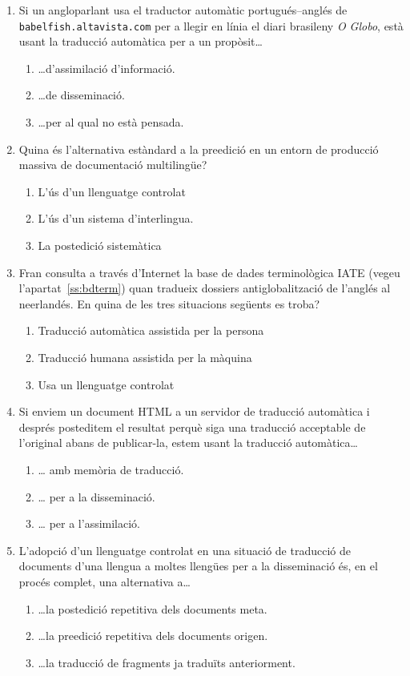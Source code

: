 \begin{enumerate}
\item Si un angloparlant usa el traductor automàtic portugués--anglés
  de \verb|babelfish.altavista.com| per a llegir en línia el diari
  brasileny \emph{O Globo}, està usant la traducció automàtica per a
  un propòsit\ldots
  \begin{enumerate}
  \item \ldots d'assimilació d'informació.
  \item \ldots de disseminació.
  \item \ldots per al qual no està pensada.
  \end{enumerate}

\item Quina és l'alternativa estàndard a la preedició en un entorn de
  producció massiva de documentació multilingüe?
  \begin{enumerate}
  \item L'ús d'un llenguatge controlat
  \item L'ús d'un sistema d'interlingua.
  \item La postedició sistemàtica
  \end{enumerate}

\item Fran consulta a través d'Internet la base de dades terminològica
  IATE (vegeu l'apartat~\ref{ss:bdterm}) quan tradueix dossiers
  antiglobalització de l'anglés al neerlandés. En quina de les tres
  situacions següents es troba?
  \begin{enumerate}
  \item Traducció automàtica assistida per la persona
  \item Traducció humana assistida per la màquina
  \item Usa un llenguatge controlat
\end{enumerate}

\item Si enviem un document HTML a un servidor de traducció automàtica
  i després posteditem el resultat perquè siga una traducció
  acceptable de l'original abans de publicar-la, estem usant la
  traducció automàtica{\ldots}   
  \begin{enumerate}
  \item {\ldots} amb memòria de traducció.
  \item {\ldots} per a la disseminació.
  \item {\ldots} per a l'assimilació.
  \end{enumerate}

\item L'adopció d'un llenguatge controlat en una situació de traducció
  de documents d'una llengua a moltes llengües per a la disseminació
  és, en el procés complet, una alternativa a{\ldots}
  \begin{enumerate}
  \item {\ldots}la postedició repetitiva dels documents meta.
  \item {\ldots}la preedició repetitiva dels documents origen.
  \item {\ldots}la traducció de fragments ja traduïts anteriorment.
  \end{enumerate}


\end{enumerate}
